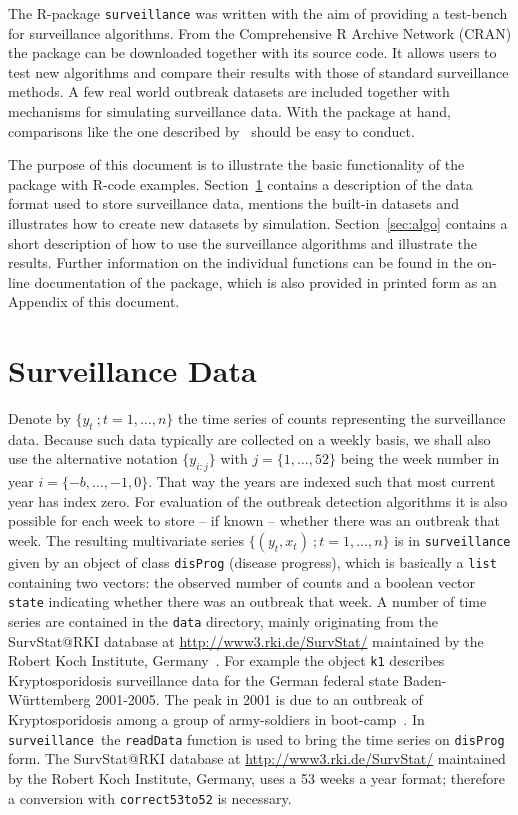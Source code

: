 \documentclass[a4paper,11pt]{article}
\newcommand{\surveillance}{\texttt{surveillance}}
\begin{document}
The R-package \texttt{surveillance} was written with the aim of
providing a test-bench for surveillance algorithms. From the
Comprehensive R Archive Network (CRAN) the package can be downloaded
together with its source code. It allows users to test new algorithms
and compare their results with those of standard surveillance
methods. A few real world outbreak datasets are included together with
mechanisms for simulating surveillance data.  With the package at
hand, comparisons like the one described by~\citet{hutwagner2005}
should be easy to conduct.

The purpose of this document is to illustrate the basic functionality
of the package with R-code examples.  Section~\ref{sec:data} contains
a description of the data format used to store surveillance data,
mentions the built-in datasets and illustrates how to create new
datasets by simulation.  Section~\ref{sec:algo} contains a short
description of how to use the surveillance algorithms and illustrate
the results.  Further information on the individual functions can be
found in the on-line documentation of the package, which is also
provided in printed form as an Appendix of this document.

\section{Surveillance Data}\label{sec:data}
Denote by $\{y_t\>;t=1,\ldots,n\}$ the time series of counts
representing the surveillance data. Because such data typically are
collected on a weekly basis, we shall also use the alternative
notation $\{y_{i:j}\}$ with $j=\{1,\ldots,52\}$ being the week number
in year $i=\{-b,\ldots,-1,0\}$. That way the years are indexed such
that most current year has index zero. For evaluation of the outbreak
detection algorithms it is also possible for each week to store -- if
known -- whether there was an outbreak that week. The resulting
multivariate series $\{(y_t,x_t)\>; t=1,\ldots,n\}$ is in
\texttt{surveillance} given by an object of class \texttt{disProg}
(disease progress), which is basically a \texttt{list} containing two
vectors: the observed number of counts and a boolean vector
\texttt{state} indicating whether there was an outbreak that week. A
number of time series are contained in the \texttt{data} directory,
mainly originating from the SurvStat@RKI database at
\href{http://www3.rki.de/SurvStat/}{http://www3.rki.de/SurvStat/}
maintained by the Robert Koch Institute, Germany~\citep{survstat}.
For example the object \texttt{k1} describes Kryptosporidosis
surveillance data for the German federal state Baden-W\"{u}rttemberg
2001-2005. The peak in 2001 is due to an outbreak of Kryptosporidosis
among a group of army-soldiers in boot-camp~\citep{bulletin3901}. In
\surveillance\ the \texttt{readData} function is used to bring the
time series on \texttt{disProg} form. The SurvStat@RKI database at
\href{http://www3.rki.de/SurvStat/}{http://www3.rki.de/SurvStat/}
maintained by the Robert Koch Institute, Germany, uses a 53 weeks a
year format; therefore a conversion with \texttt{correct53to52} is
necessary.
\end{document}
